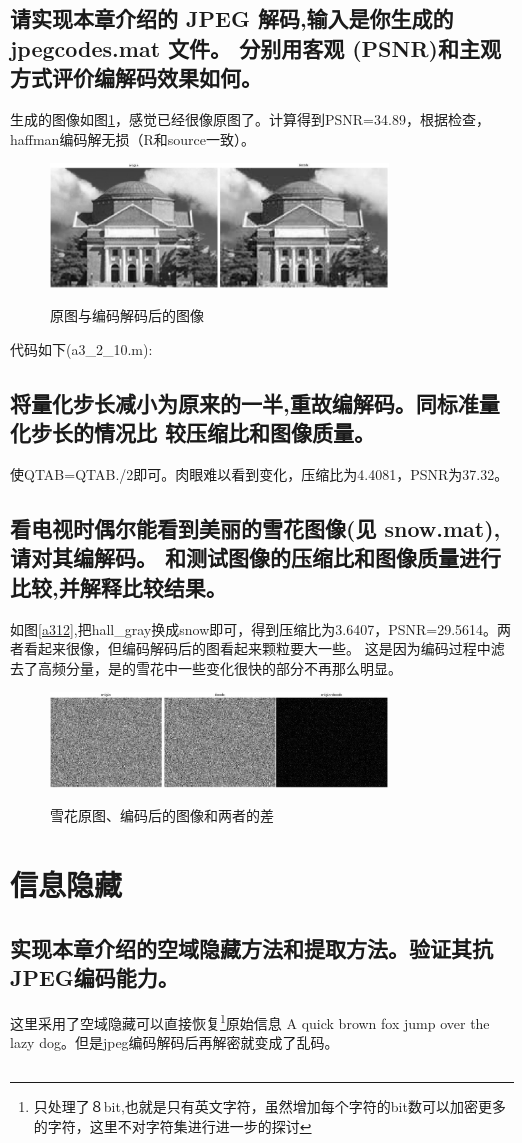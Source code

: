 \documentclass{ctexart}
\begin{document}
\subsection{
请实现本章介绍的 JPEG 解码,输入是你生成的 jpegcodes.mat 文件。
分别用客观 (PSNR)和主观方式评价编解码效果如何。
}
生成的图像如图\ref{a3210}，感觉已经很像原图了。计算得到PSNR=34.89，根据检查，haffman编码解无损（R和source一致）。
\begin{figure}
    \centering
    \includegraphics[width=0.8\textwidth]{a3_2_10.jpg}\\
    \caption{原图与编码解码后的图像\label{a3210}}
\end{figure}

代码如下(a3\_2\_10.m):


\subsection{
将量化步长减小为原来的一半,重故编解码。同标准量化步长的情况比
较压缩比和图像质量。
}
使QTAB=QTAB./2即可。肉眼难以看到变化，压缩比为4.4081，PSNR为37.32。

\subsection{
 看电视时偶尔能看到美丽的雪花图像(见 snow.mat),请对其编解码。
和测试图像的压缩比和图像质量进行比较,并解释比较结果。
}
如图\ref{a312},把hall\_gray换成snow即可，得到压缩比为3.6407，PSNR=29.5614。两者看起来很像，但编码解码后的图看起来颗粒要大一些。
这是因为编码过程中滤去了高频分量，是的雪花中一些变化很快的部分不再那么明显。
\begin{figure}
    \centering
    \includegraphics[width=0.8\textwidth]{a3_2_12.jpg}\\
    \caption{雪花原图、编码后的图像和两者的差\label{a3212}}
\end{figure}

\section{信息隐藏}
\subsection{实现本章介绍的空域隐藏方法和提取方法。验证其抗JPEG编码能力。}    
这里采用了空域隐藏可以直接恢复\footnote{只处理了８bit,也就是只有英文字符，虽然增加每个字符的bit数可以加密更多的字符，这里不对字符集进行进一步的探讨}原始信息 A quick brown fox jump over the lazy dog。但是jpeg编码解码后再解密就变成了乱码。

\subsection{
}
\end{document}
